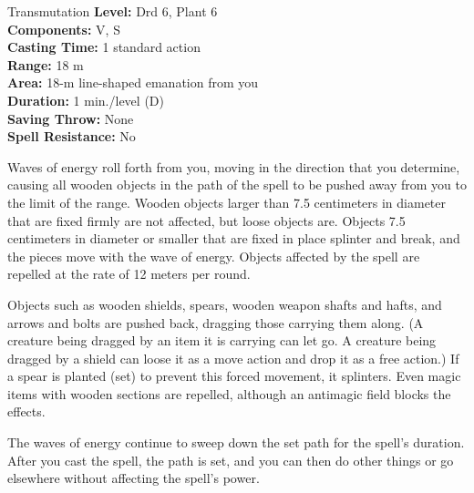 {Transmutation}
{
	\textbf{Level:}
	Drd 6, Plant 6\\
	\textbf{Components:}
	V, S\\
	\textbf{Casting Time:}
	1 standard action\\
	\textbf{Range:}
	18 m\\
	\textbf{Area:}
	18-m line-shaped emanation from you\\
	\textbf{Duration:}
	1 min./level (D)\\
	\textbf{Saving Throw:}
	None\\
	\textbf{Spell Resistance:}
	No\\
}
{
	Waves of energy roll forth from you, moving in the direction that you determine, causing all wooden objects in the path of the spell to be pushed away from you to the limit of the range. Wooden objects larger than 7.5 centimeters in diameter that are fixed firmly are not affected, but loose objects are. Objects 7.5 centimeters in diameter or smaller that are fixed in place splinter and break, and the pieces move with the wave of energy. Objects affected by the spell are repelled at the rate of 12 meters per round.

	Objects such as wooden shields, spears, wooden weapon shafts and hafts, and arrows and bolts are pushed back, dragging those carrying them along. (A creature being dragged by an item it is carrying can let go. A creature being dragged by a shield can loose it as a move action and drop it as a free action.) If a spear is planted (set) to prevent this forced movement, it splinters. Even magic items with wooden sections are repelled, although an antimagic field blocks the effects.

	The waves of energy continue to sweep down the set path for the spell's duration. After you cast the spell, the path is set, and you can then do other things or go elsewhere without affecting the spell's power.

}
